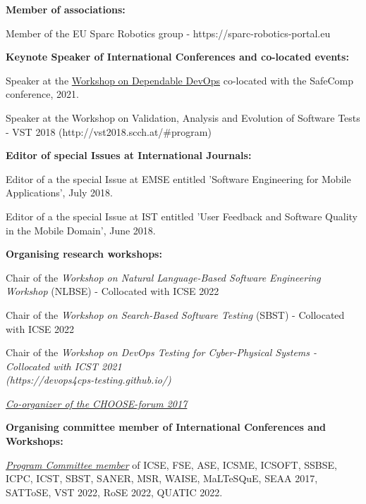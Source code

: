 \documentclass[12pt]{article}
\newcommand\on[1]{\nbc{ON}{#1}{red}} %
\begin{document}
\vspace{3.5mm}

\textbf{Member of associations:}
\begin{innerlist}
\item Member of the EU Sparc Robotics group - https://sparc-robotics-portal.eu
\end{innerlist}

\textbf{Keynote Speaker of International Conferences and co-located events:}
\begin{innerlist}
\item Speaker at the \href{https://safecomp2021.hosted.york.ac.uk/wp-content/uploads/2021/08/DepDevOps_2021_programme.pdf}{Workshop on Dependable DevOps} co-located with the SafeComp conference, 2021.
\item Speaker at the Workshop on Validation, Analysis and Evolution of Software Tests - VST 2018  (http://vst2018.scch.at/\#program) 
\end{innerlist}

\textbf{Editor of special Issues at International Journals:}
\begin{innerlist}
\item Editor of a the special Issue at EMSE entitled 'Software Engineering for Mobile Applications', July 2018.
\item Editor of a the special Issue at IST entitled 'User Feedback and Software Quality in the Mobile Domain',  June 2018.
	
\end{innerlist}

\textbf{Organising research workshops:}
\begin{innerlist}
\item Chair of the \textit{Workshop on Natural Language-Based Software Engineering Workshop} (NLBSE) - Collocated with ICSE 2022
\item Chair of  the \textit{Workshop on Search-Based Software Testing} (SBST) - Collocated with ICSE 2022
\item Chair of the \textit{Workshop on DevOps Testing for Cyber-Physical Systems - Collocated with ICST 2021 \\(https://devops4cps-testing.github.io/)} 
\item \textit{\href{http://www.choose.s-i.ch/events/forum2017/index.html}{Co-organizer of the CHOOSE-forum 2017}} 
\end{innerlist}

\textbf{Organising committee member of International Conferences and Workshops:}
\begin{innerlist}
 \item \href{https://spanichella.github.io/#services}{\textit{Program Committee member}} of ICSE, FSE, ASE, ICSME, ICSOFT, SSBSE, ICPC, ICST, SBST, SANER, MSR, WAISE, MaLTeSQuE, SEAA 2017, SATToSE, VST 2022, RoSE 2022, QUATIC 2022.
 \end{innerlist}
\end{document}
